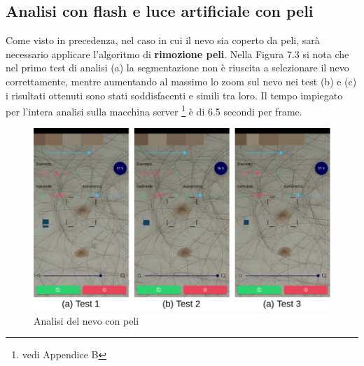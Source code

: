 {\subsection{Analisi con flash e luce artificiale con peli} 
Come visto in precedenza, nel caso in cui il nevo sia coperto da peli, sarà necessario applicare l'algoritmo di \textbf{rimozione peli}.
Nella Figura 7.3 si nota che nel primo test di analisi (a) la segmentazione non è riuscita a selezionare il nevo correttamente, mentre aumentando al massimo lo zoom sul nevo nei test (b) e (c) i risultati ottenuti sono stati soddisfacenti e simili tra loro.
Il tempo impiegato per l'intera analisi sulla macchina server \footnote{vedi Appendice B} è di 6.5 secondi per frame.
\begin{figure}[h]
	\begin{center}
		\includegraphics[scale=0.45]{figure/capitolo7/test3.png}
	\end{center}
	\caption{Analisi del nevo con peli}	
\end{figure}
\newpage
}
